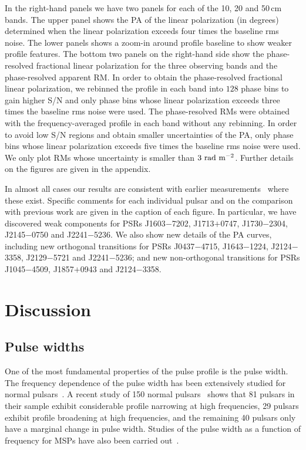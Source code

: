 \documentclass[useAMS,usenatbib]{mn2e}
\begin{document}
In the right-hand panels we have two panels for each of the 10, 20 and 50\,cm bands. The upper 
panel shows the PA of the linear polarization (in degrees) determined when the 
linear polarization exceeds four times the baseline rms noise.  
%
The lower panels shows a zoom-in around profile baseline to show weaker profile features. 
%
The bottom two panels on the right-hand side show the phase-resolved fractional linear polarization 
for the three observing bands and the phase-resolved apparent RM.
%
In order to obtain the phase-resolved fractional linear polarization, we rebinned the profile 
in each band into $128$ phase bins to gain higher S/N and only phase bins whose linear polarization 
exceeds three times the baseline rms noise were used. 
%
The phase-resolved RMs were obtained with the frequency-averaged profile in each band 
without any rebinning. In order to avoid low S/N regions and obtain smaller uncertainties of 
the PA, only phase bins whose linear polarization exceeds five times the baseline rms noise 
were used. We only plot RMs whose uncertainty is smaller than $3\ \rm{rad\ m^{-2}}$.
%
Further details on the figures are given in the appendix.

In almost all cases our results are consistent with earlier measurements~\citep[such as][]{Ord04,Yan11}
where these exist.
%
Specific comments for each individual pulsar and on the comparison with 
previous work are given in the caption of each figure.   
%
In particular, we have discovered weak components for PSRs J1603$-$7202, J1713$+$0747, 
J1730$-$2304, J2145$-$0750 and J2241$-$5236. We also show new details of the PA curves, 
including new orthogonal transitions for PSRs J0437$-$4715, J1643$-$1224, J2124$-$3358, 
J2129$-$5721 and J2241$-$5236; and new non-orthogonal transitions for PSRs J1045$-$4509, 
J1857$+$0943 and J2124$-$3358.


\section{Discussion}

\subsection{Pulse widths}

One of the most fundamental properties of the pulse profile is the pulse width.    
The frequency dependence of the pulse width has been extensively studied for normal pulsars~\citep[e.g.,][]{Cordes78,Thorsett91}.
A recent study of 150 normal pulsars~\citep{Chen14} shows that 81 pulsars in their sample exhibit 
considerable profile narrowing at high frequencies, 29 pulsars exhibit profile broadening at high 
frequencies, and the remaining 40 pulsars only have a marginal change in pulse width. 
Studies of the pulse width as a function of frequency for MSPs have also been carried 
out~\citep[e.g.,][]{Kramer99}.
% 
\end{document}
